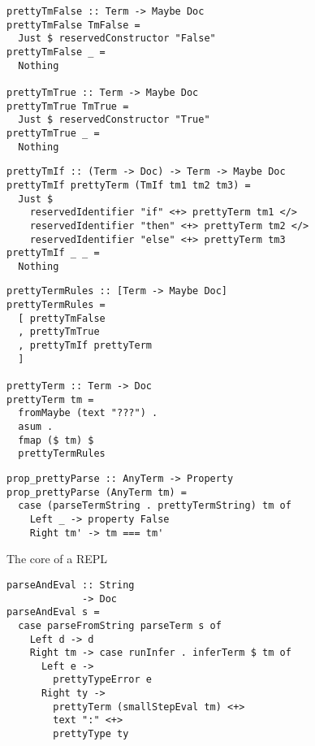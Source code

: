 \documentclass{beamer}
\begin{document}
\begin{frame}[fragile]
  \begin{verbatim}
prettyTmFalse :: Term -> Maybe Doc
prettyTmFalse TmFalse =
  Just $ reservedConstructor "False"
prettyTmFalse _ =
  Nothing

prettyTmTrue :: Term -> Maybe Doc
prettyTmTrue TmTrue =
  Just $ reservedConstructor "True"
prettyTmTrue _ =
  Nothing
  \end{verbatim}
\end{frame} 

\begin{frame}[fragile]
  \begin{verbatim}
prettyTmIf :: (Term -> Doc) -> Term -> Maybe Doc
prettyTmIf prettyTerm (TmIf tm1 tm2 tm3) =
  Just $
    reservedIdentifier "if" <+> prettyTerm tm1 </>
    reservedIdentifier "then" <+> prettyTerm tm2 </>
    reservedIdentifier "else" <+> prettyTerm tm3
prettyTmIf _ _ =
  Nothing
  \end{verbatim}
\end{frame} 

\begin{frame}[fragile]
  \begin{verbatim}
prettyTermRules :: [Term -> Maybe Doc]
prettyTermRules =
  [ prettyTmFalse
  , prettyTmTrue
  , prettyTmIf prettyTerm
  ]

prettyTerm :: Term -> Doc
prettyTerm tm =
  fromMaybe (text "???") .
  asum .
  fmap ($ tm) $
  prettyTermRules
  \end{verbatim}
\end{frame} 

\begin{frame}[fragile]
  \begin{verbatim}
prop_prettyParse :: AnyTerm -> Property
prop_prettyParse (AnyTerm tm) =
  case (parseTermString . prettyTermString) tm of
    Left _ -> property False
    Right tm' -> tm === tm'
  \end{verbatim}
\end{frame} 

\begin{frame}[fragile]
  \begin{center}
   The core of a REPL 
  \end{center}
  \begin{verbatim}
parseAndEval :: String
             -> Doc
parseAndEval s =
  case parseFromString parseTerm s of
    Left d -> d
    Right tm -> case runInfer . inferTerm $ tm of
      Left e -> 
        prettyTypeError e
      Right ty ->
        prettyTerm (smallStepEval tm) <+> 
        text ":" <+> 
        prettyType ty
  \end{verbatim}
\end{frame} 
\end{document}
